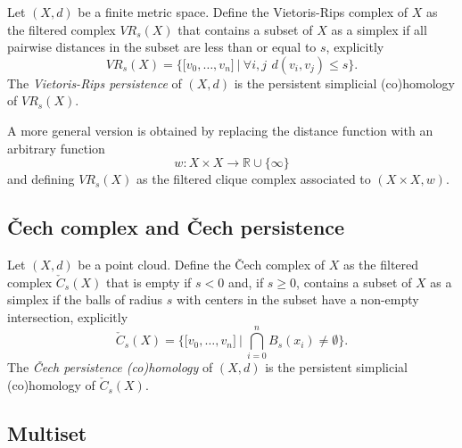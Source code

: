 \documentclass{amsart}
\begin{document}
	Let $(X, d)$ be a 
	finite metric space. Define the Vietoris-Rips complex of $X$ as the
	filtered complex $VR_s(X)$ that contains a subset of $X$ as a simplex if all pairwise distances in the subset are less than or equal to $s$, explicitly
	\begin{equation*}
	VR_s(X) = \Big\{ \lbrack v_0,\dots,v_n \rbrack \ \Big|\ \forall i,j\ \,d(v_i, v_j) \leq s \Big\}.
	\end{equation*}
	The \textit{Vietoris-Rips persistence} of $(X, d)$ is the 
	persistent simplicial (co)homology of $VR_s(X)$.
	
	A more general version is obtained by replacing the distance function with an arbitrary function
	\begin{equation*}
	w : X \times X \to \mathbb R \cup \{\infty\}
	\end{equation*}
	and defining $VR_s(X)$ as the 
	filtered clique complex associated to $(X \times X ,w)$.
	
	\subsection*{\v{C}ech complex and \v{C}ech persistence} \label{cech_complex_and_cech_persistence}
	
	Let $(X, d)$ be a 
	point cloud. Define the \v{C}ech complex of $X$ as the 
	filtered complex $\check{C}_s(X)$ that is empty if $s<0$ and, if $s \geq 0$, contains a subset of $X$ as a simplex if the balls of radius $s$ with centers in the subset have a non-empty intersection, explicitly
	\begin{equation*}
	\check{C}_s(X) = \Big\{ \lbrack v_0,\dots,v_n \rbrack \ \Big|\ \bigcap_{i=0}^n B_s(x_i) \neq \emptyset \Big\}.
	\end{equation*}
	The \textit{\v Cech persistence (co)homology} of $(X,d)$ is the 
	persistent simplicial (co)homology of $\check{C}_s(X)$.
	
	\subsection*{Multiset} \label{multiset}
	
\end{document}
